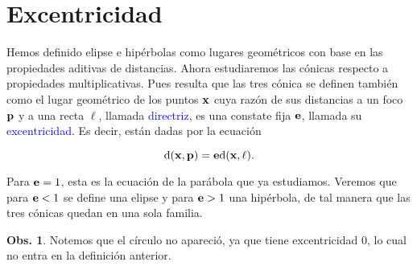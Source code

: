 \documentclass{article}
\theoremstyle{definicion}
\theoremstyle{definition}             %
\theoremstyle{definition}             %
\theoremstyle{definition}
\theoremstyle{definition}
\theoremstyle{observacion}
\newtheorem{obs}{Obs.}
\theoremstyle{definition}
\theoremstyle{plain}
\theoremstyle{definition}
\theoremstyle{afirmacion}
\theoremstyle{notation}
\theoremstyle{definition}
\begin{document}


    \section{Excentricidad}

    Hemos definido elipse e hipérbolas como lugares geométricos con base en las propiedades aditivas de distancias. Ahora estudiaremos las cónicas respecto a propiedades multiplicativas. Pues resulta que las tres cónica se definen también como el lugar geométrico de los puntos \(\vb{x}\) cuya razón de sus distancias a un foco \(\vb{p}\) y a una recta \(\ell\), llamada \textcolor{blue}{directriz}, es una constate fija \(\vb{e}\), llamada su \textcolor{blue}{excentricidad}. Es decir, están dadas por la ecuación
    
    \begin{equation*}
        \textrm{d}(\vb{x}, \vb{p}) = \vb{e} \textrm{d}(\vb{x}, \ell).
    \end{equation*}

    Para \(\vb{e} = 1\), esta es la ecuación de la parábola que ya estudiamos. Veremos que para \(\vb{e} < 1\) se define una elipse y para \(\vb{e} > 1\) una hipérbola, de tal manera que las tres cónicas quedan en una sola familia.

    \begin{obs}
        Notemos que el círculo no apareció, ya que tiene excentricidad \(0\), lo cual no entra en la definición anterior.
    \end{obs}
\end{document}
